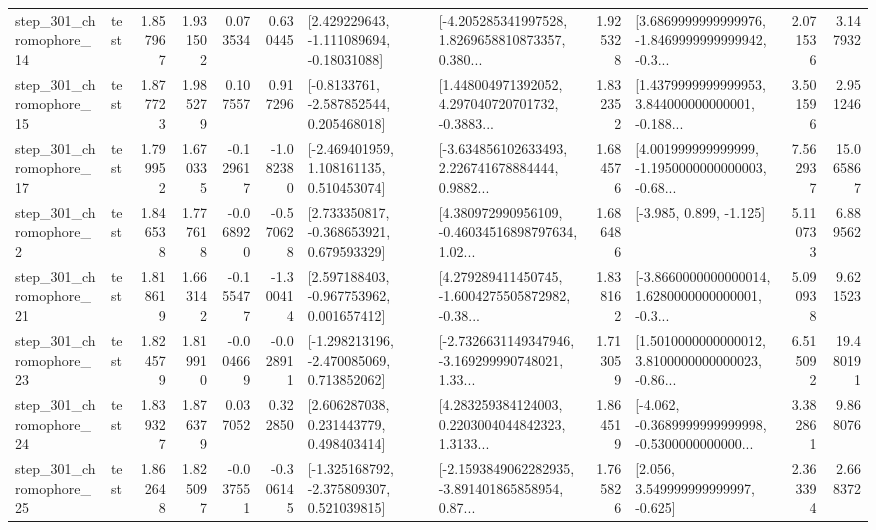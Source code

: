 \begin{tabular}{llrrrrllrlrr}
  step\_301\_chromophore\_14 &      test &      1.857967 &    1.931502 &      0.073534 &  0.630445 &    [2.429229643, -1.111089694, -0.18031088] &  [-4.205285341997528, 1.8269658810873357, 0.380... &       1.925328 &  [3.6869999999999976, -1.8469999999999942, -0.3... &            2.071536 &          3.147932 \\
  step\_301\_chromophore\_15 &      test &      1.877723 &    1.985279 &      0.107557 &  0.917296 &     [-0.8133761, -2.587852544, 0.205468018] &  [1.448004971392052, 4.297040720701732, -0.3883... &       1.832352 &  [1.4379999999999953, 3.844000000000001, -0.188... &            3.501596 &          2.951246 \\
  step\_301\_chromophore\_17 &      test &      1.799952 &    1.670335 &     -0.129617 & -1.082380 &    [-2.469401959, 1.108161135, 0.510453074] &  [-3.634856102633493, 2.226741678884444, 0.9882... &       1.684576 &  [4.001999999999999, -1.1950000000000003, -0.68... &            7.562937 &         15.065867 \\
   step\_301\_chromophore\_2 &      test &      1.846538 &    1.777618 &     -0.068920 & -0.570628 &    [2.733350817, -0.368653921, 0.679593329] &  [4.380972990956109, -0.46034516898797634, 1.02... &       1.686486 &                            [-3.985, 0.899, -1.125] &            5.110733 &          6.889562 \\
  step\_301\_chromophore\_21 &      test &      1.818619 &    1.663142 &     -0.155477 & -1.300414 &    [2.597188403, -0.967753962, 0.001657412] &  [4.279289411450745, -1.6004275505872982, -0.38... &       1.838162 &  [-3.8660000000000014, 1.6280000000000001, -0.3... &            5.090938 &          9.621523 \\
  step\_301\_chromophore\_23 &      test &      1.824579 &    1.819910 &     -0.004669 & -0.028911 &   [-1.298213196, -2.470085069, 0.713852062] &  [-2.7326631149347946, -3.169299990748021, 1.33... &       1.713059 &  [1.5010000000000012, 3.8100000000000023, -0.86... &            6.515092 &         19.480191 \\
  step\_301\_chromophore\_24 &      test &      1.839327 &    1.876379 &      0.037052 &  0.322850 &     [2.606287038, 0.231443779, 0.498403414] &  [4.283259384124003, 0.2203004044842323, 1.3133... &       1.864519 &  [-4.062, -0.3689999999999998, -0.5300000000000... &            3.382861 &          9.868076 \\
  step\_301\_chromophore\_25 &      test &      1.862648 &    1.825097 &     -0.037551 & -0.306145 &   [-1.325168792, -2.375809307, 0.521039815] &  [-2.1593849062282935, -3.891401865858954, 0.87... &       1.765826 &                 [2.056, 3.549999999999997, -0.625] &            2.363394 &          2.668372 \\

\end{tabular}
